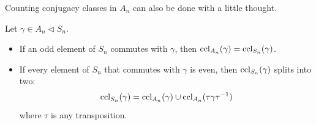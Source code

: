 \documentclass{../../template/note}
\begin{document}
    Counting conjugacy classes in \(A_n\) can also be done with a little thought.

    \begin{lemma}
        Let \(\gamma \in A_n \triangleleft S_n\).
        \begin{itemize}
            \item If an odd element of \(S_n\) commutes with \(\gamma\), then \(\operatorname{ccl}_{A_n}(\gamma) = \operatorname{ccl}_{S_n}(\gamma)\).
            \item If every element of \(S_n\) that commutes with \(\gamma\) is even, then \(\operatorname{ccl}_{S_n}(\gamma)\) splits into two:
            \[
                \operatorname{ccl}_{S_n}(\gamma) = \operatorname{ccl}_{A_n}(\gamma) \cup \operatorname{ccl}_{A_n}(\tau \gamma \tau^{-1})
            \]
            where \(\tau\) is any transposition.
        \end{itemize}        
    \end{lemma}
    
\end{document}
